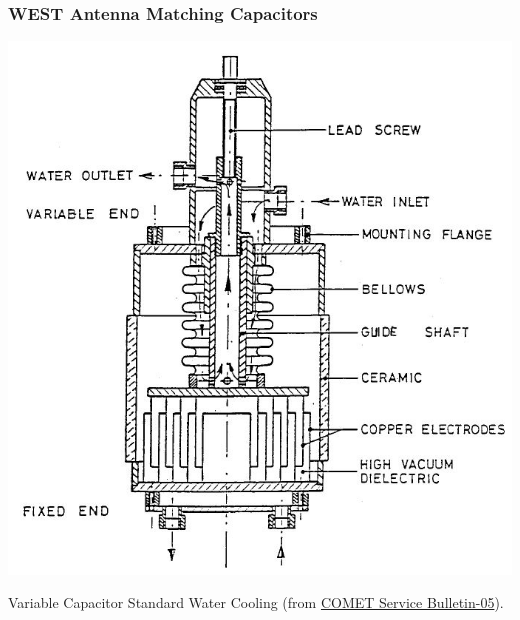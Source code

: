 {\subsubsection{WEST Antenna Matching Capacitors}
\begin{marginfigure}
	\centering
	\includegraphics[width=1.0\linewidth]{figures/chap3/WEST_ICRH/COMET_capacitor}
	\caption{Variable Capacitor Standard Water Cooling (from \href{https://www.comet-pct.com/getmedia/525c5fbc-2356-4c2e-8e62-3f8a3c3da16c/SB-05_Variable_Capacitor_Water_Cooling.aspx}{COMET Service Bulletin-05}).	
}
	\label{fig:cometcapacitor}
\end{marginfigure}

}
